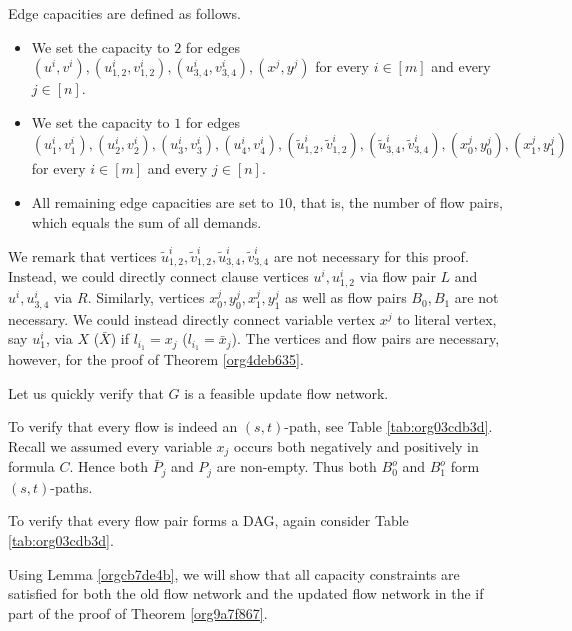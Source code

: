 \documentclass[fontsize=11pt,paper=a4]{book}
\begin{document}
Edge capacities are defined as follows.

\begin{itemize}
\item We set the capacity to \(2\) for edges \((u^i,v^i),(u_{1,2}^i,v_{1,2}^i),(u_{3,4}^i,v_{3,4}^i),(x^j,y^j)\) for every \(i\in[m]\) and every \(j\in[n]\).
\item We set the capacity to \(1\) for edges \((u_1^i,v_1^i),(u_2^i,v_2^i),(u_3^i,v_3^i),(u_4^i,v_4^i),(\tilde{u}_{1,2}^i,\tilde{v}_{1,2}^i),(\tilde{u}_{3,4}^i,\tilde{v}_{3,4}^i),(x_0^j,y_0^j),(x_1^j,y_1^j)\) for every \(i\in[m]\) and every \(j\in[n]\).
\item All remaining edge capacities are set to \(10\), that is, the number of flow pairs, which equals the sum of all demands.
\end{itemize}

We remark that vertices \(\tilde{u}_{1,2}^i,\tilde{v}_{1,2}^i,\tilde{u}_{3,4}^i,\tilde{v}_{3,4}^i\) are not necessary for this proof.
Instead, we could directly connect clause vertices \(u^i,u_{1,2}^i\) via flow pair \(L\) and \(u^i,u_{3,4}^i\) via \(R\).
Similarly, vertices \(x_0^j,y_0^j,x_1^j,y_1^j\) as well as flow pairs \(B_0,B_1\) are not necessary.
We could instead directly connect variable vertex \(x^j\) to literal vertex, say \(u_1^i\), via \(X\) (\(\bar{X}\)) if \(l_{i_1}=x_j\) (\(l_{i_1}=\bar{x}_j\)).
The vertices and flow pairs are necessary, however, for the proof of Theorem \ref{org4deb635}.

Let us quickly verify that \(G\) is a feasible update flow network.

To verify that every flow is indeed an \((s,t)\)-path, see Table \ref{tab:org03cdb3d}.
Recall we assumed every variable \(x_j\) occurs both negatively and positively in formula \(C\).
Hence both \(\bar{P}_j\) and \(P_j\) are non-empty.
Thus both \(B_0^o\) and \(B_1^o\) form \((s,t)\)-paths.

To verify that every flow pair forms a DAG, again consider Table \ref{tab:org03cdb3d}.

Using Lemma \ref{orgcb7de4b}, we will show that all capacity constraints are satisfied for both the old flow network and the updated flow network in the if part of the proof of Theorem \ref{org9a7f867}.
\end{document}
